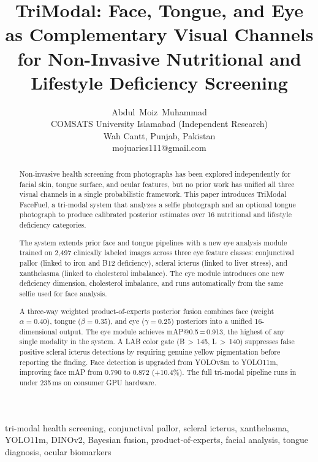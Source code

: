 \documentclass[journal]{IEEEtran}
\begin{document}
\title{TriModal: Face, Tongue, and Eye as Complementary Visual Channels\\
for Non-Invasive Nutritional and Lifestyle Deficiency Screening}

\author{Abdul~Moiz~Muhammad\\
COMSATS University Islamabad (Independent Research)\\
Wah Cantt, Punjab, Pakistan\\
mojuaries111@gmail.com}

\maketitle

\begin{abstract}
Non-invasive health screening from photographs has been explored independently
for facial skin, tongue surface, and ocular features, but no prior work has
unified all three visual channels in a single probabilistic framework.
This paper introduces TriModal FaceFuel, a tri-modal system that analyzes a
selfie photograph and an optional tongue photograph to produce calibrated
posterior estimates over 16 nutritional and lifestyle deficiency categories.

The system extends prior face and tongue pipelines
\cite{muhammad2026facefuel,muhammad2026bimodal} with a new eye analysis module
trained on 2{,}497 clinically labeled images across three eye feature classes:
conjunctival pallor (linked to iron and B12 deficiency), scleral icterus
(linked to liver stress), and xanthelasma (linked to cholesterol imbalance).
The eye module introduces one new deficiency dimension, cholesterol imbalance,
and runs automatically from the same selfie used for face analysis.

A three-way weighted product-of-experts posterior fusion combines face
(weight $\alpha=0.40$), tongue ($\beta=0.35$), and eye ($\gamma=0.25$)
posteriors into a unified 16-dimensional output. The eye module achieves
mAP@0.5\,=\,0.913, the highest of any single modality in the system.
A LAB color gate (B\,$>$\,145, L\,$>$\,140) suppresses false positive
scleral icterus detections by requiring genuine yellow pigmentation
before reporting the finding. Face detection is upgraded from YOLOv8m
to YOLO11m, improving face mAP from 0.790 to 0.872 (+10.4\%).
The full tri-modal pipeline runs in under 235\,ms on consumer GPU hardware.
\end{abstract}

\begin{IEEEkeywords}
tri-modal health screening, conjunctival pallor, scleral icterus,
xanthelasma, YOLO11m, DINOv2, Bayesian fusion, product-of-experts,
facial analysis, tongue diagnosis, ocular biomarkers
\end{IEEEkeywords}
\end{document}
